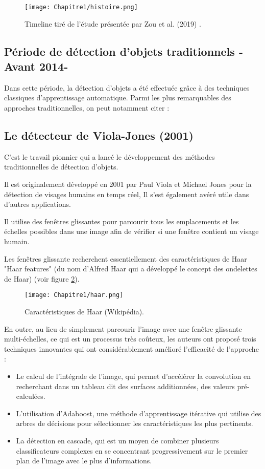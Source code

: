 \begin{figure}[H]
\centering
\texttt{[image: Chapitre1/histoire.png]}
\caption{Timeline tiré de l'étude présentée par Zou et al. (2019) \cite{hist}.}
\label{histoire}
\end{figure}

\subsection{Période de détection d'objets traditionnels -Avant 2014-}
Dans cette période, la détection d'objets a été effectuée grâce à des techniques classiques d'apprentissage automatique. Parmi les plus remarquables des approches traditionnelles, on peut notamment citer :
 
\subsection{Le détecteur de Viola-Jones  (2001)}
C'est le travail pionnier qui a lancé le développement des méthodes traditionnelles de détection d'objets.

Il est originalement développé en 2001 par Paul Viola et Michael Jones \cite{violas} pour la détection de visages humains en temps réel, Il s'est également avéré utile dans d'autres applications.

Il utilise des fenêtres glissantes pour parcourir tous les emplacements et les  échelles possibles dans une image afin de vérifier si une fenêtre contient un visage humain. 

Les fenêtres glissante recherchent essentiellement des caractéristiques de Haar "Haar features"  (du nom d'Alfred Haar qui a développé le concept des ondelettes de Haar) (voir figure \ref{haar}).

\begin{figure}[H]
\centering
\texttt{[image: Chapitre1/haar.png]}
\caption{Caractéristiques de Haar (Wikipédia).}
\label{haar}
\end{figure}

En outre, au lieu de simplement parcourir l'image avec une fenêtre glissante multi-échelles, ce qui est un processus très coûteux, les auteurs ont proposé trois techniques innovantes qui ont considérablement amélioré l'efficacité de l'approche :  

\begin{itemize}
\item Le calcul de l'intégrale de l'image, qui permet d'accélérer la convolution en recherchant dans un tableau dit des surfaces additionnées, des valeurs pré-calculées.
\item L'utilisation d'Adaboost, une méthode d'apprentissage itérative qui  utilise des arbres de décisions pour sélectionner les caractéristiques les plus pertinents.
\item La détection en cascade, qui est un moyen de combiner plusieurs classificateurs complexes en se concentrant progressivement sur le premier plan de l'image avec le plus d'informations.
\end{itemize}
    
